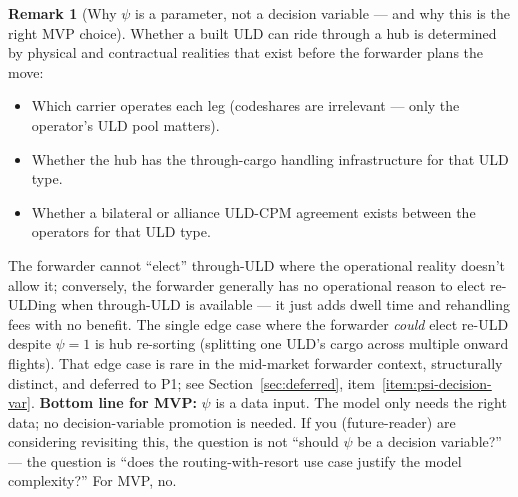 \documentclass[11pt,a4paper]{article}
\theoremstyle{definition}
\newtheorem{remark}{Remark}
\begin{document}
\begin{remark}[Why $\psi$ is a parameter, not a decision variable --- and why this is the right MVP choice]
\label{rem:psi-as-param}
Whether a built ULD can ride through a hub is determined by physical and contractual
realities that exist before the forwarder plans the move:
\begin{itemize}[noitemsep]
  \item Which carrier operates each leg (codeshares are irrelevant --- only the operator's
        ULD pool matters).
  \item Whether the hub has the through-cargo handling infrastructure for that ULD type.
  \item Whether a bilateral or alliance ULD-CPM agreement exists between the operators
        for that ULD type.
\end{itemize}
The forwarder cannot ``elect'' through-ULD where the operational reality doesn't allow it;
conversely, the forwarder generally has no operational reason to elect re-ULDing when
through-ULD is available --- it just adds dwell time and rehandling fees with no benefit.
The single edge case where the forwarder \emph{could} elect re-ULD despite $\psi = 1$
is hub re-sorting (splitting one ULD's cargo across multiple onward flights). That edge
case is rare in the mid-market forwarder context, structurally distinct, and deferred to
P1; see Section~\ref{sec:deferred}, item~\ref{item:psi-decision-var}.
\textbf{Bottom line for MVP:} $\psi$ is a data input. The model only needs the right data;
no decision-variable promotion is needed. If you (future-reader) are considering revisiting
this, the question is not ``should $\psi$ be a decision variable?'' --- the question is
``does the routing-with-resort use case justify the model complexity?'' For MVP, no.
\end{remark}
\end{document}
